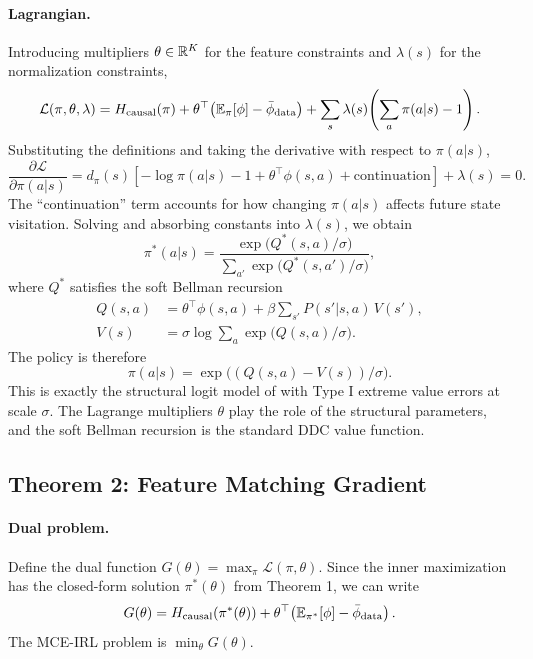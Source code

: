 \documentclass[10pt]{article}
\newcommand{\calL}{\mathcal{L}}
\begin{document}
\paragraph{Lagrangian.}
Introducing multipliers $\theta \in \mathbb{R}^K$ for the feature constraints and $\lambda(s)$ for the normalization constraints,
\begin{equation}
\calL(\pi, \theta, \lambda) = H_{\text{causal}}(\pi) + \theta^\top\!\left(\E_\pi[\phi] - \bar\phi_{\text{data}}\right) + \sum_s \lambda(s)\!\left(\sum_a \pi(a|s) - 1\right).
\end{equation}
Substituting the definitions and taking the derivative with respect to $\pi(a|s)$,
\begin{equation}
\frac{\partial \calL}{\partial \pi(a|s)} = d_\pi(s)\!\left[-\log \pi(a|s) - 1 + \theta^\top \phi(s,a) + \text{continuation}\right] + \lambda(s) = 0.
\end{equation}
The ``continuation'' term accounts for how changing $\pi(a|s)$ affects future state visitation. Solving and absorbing constants into $\lambda(s)$, we obtain
\begin{equation}
\pi^*(a|s) = \frac{\exp\!\bigl(Q^*(s,a)/\sigma\bigr)}{\sum_{a'} \exp\!\bigl(Q^*(s,a')/\sigma\bigr)},
\end{equation}
where $Q^*$ satisfies the soft Bellman recursion
\begin{align}
Q(s,a) &= \theta^\top \phi(s,a) + \beta \sum_{s'} P(s'|s,a)\, V(s'), \label{eq:soft_q} \\
V(s) &= \sigma \log \sum_{a} \exp\bigl(Q(s,a)/\sigma\bigr). \label{eq:soft_v}
\end{align}
The policy is therefore
\begin{equation}
\label{eq:soft_pi}
\pi(a|s) = \exp\!\bigl((Q(s,a) - V(s))/\sigma\bigr).
\end{equation}
This is exactly the structural logit model of \citet{rust1987} with Type I extreme value errors at scale $\sigma$. The Lagrange multipliers $\theta$ play the role of the structural parameters, and the soft Bellman recursion is the standard DDC value function.


\subsection{Theorem 2: Feature Matching Gradient}

\paragraph{Dual problem.}
Define the dual function $G(\theta) = \max_\pi \calL(\pi, \theta)$. Since the inner maximization has the closed-form solution $\pi^*(\theta)$ from Theorem 1, we can write
\begin{equation}
G(\theta) = H_{\text{causal}}(\pi^*(\theta)) + \theta^\top\!\left(\mathbb{E}_{\pi^*}[\phi] - \bar\phi_{\text{data}}\right).
\end{equation}
The MCE-IRL problem is $\min_\theta G(\theta)$.
\end{document}
